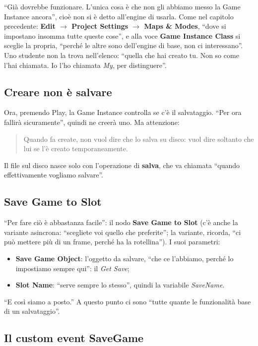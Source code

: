 ``Già dovrebbe funzionare. L'unica cosa è che non gli abbiamo messo la Game
Instance ancora'', cioè non si è detto all'engine di usarla. Come nel capitolo
precedente: \textbf{Edit $\rightarrow$ Project Settings $\rightarrow$ Maps \&
Modes}, ``dove si impostano insomma tutte queste cose'', e alla voce
\textbf{Game Instance Class} si sceglie la propria, ``perché le altre sono
dell'engine di base, non ci interessano''. Uno studente non la trova nell'elenco:
``quella che hai creato tu. Non so come l'hai chiamata. Io l'ho chiamata
\emph{My}, per distinguere''.

\subsection{Creare non è salvare}

Ora, premendo Play, la Game Instance controlla se c'è il salvataggio. ``Per ora
fallirà sicuramente'', quindi ne creerà uno. Ma attenzione:
\begin{quote}
Quando fa create, non vuol dire che lo salva su disco: vuol dire soltanto che
lui se l'è creato temporaneamente.
\end{quote}
Il file sul disco nasce solo con l'operazione di \textbf{salva}, che va
chiamata ``quando effettivamente vogliamo salvare''.

\subsection{Save Game to Slot}

``Per fare ciò è abbastanza facile'': il nodo \textbf{Save Game to Slot} (c'è
anche la variante asincrona: ``scegliete voi quello che preferite''; la
variante, ricorda, ``ci può mettere più di un frame, perché ha la rotellina''). I
suoi parametri:
\begin{itemize}
  \item \textbf{Save Game Object}: l'oggetto da salvare, ``che ce l'abbiamo,
        perché lo impostiamo sempre qui'': il \emph{Get Save};
  \item \textbf{Slot Name}: ``serve sempre lo stesso'', quindi la variabile
        \emph{SaveName}.
\end{itemize}
``E così siamo a posto.'' A questo punto ci sono ``tutte quante le funzionalità
base di un salvataggio''.

\subsection{Il custom event SaveGame}


